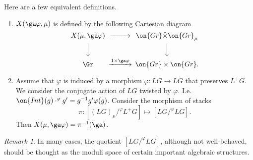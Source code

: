 \documentclass[]{pcmi}
\theoremstyle{plain}
\theoremstyle{remark}
\newtheorem{rmk}[equation]{Remark}
\theoremstyle{definition}
\newcommand{\Gr}{{\on{Gr}}}
\begin{document}
Here are a few equivalent definitions.
\begin{enumerate}
\item[(1)] $X(\ga\varphi,\mu)$ is defined by the following Cartesian diagram
\[\begin{CD}
X(\mu,\ga\varphi)@>>> \Gr\tilde\times\Gr_\mu\\
@VVV@VVV\\
\Gr@>1\times \ga\varphi>> \Gr\times \Gr.
\end{CD}\]

\item[(2)] Assume that $\varphi$ is induced by a morphism $\varphi:LG\to LG$ that preserves $L^+G$.
We consider the conjugate action of $LG$ twisted by $\varphi$. I.e. $\on{Int}(g)\cdot^\varphi g'= g^{-1}g' \varphi(g)$. Consider the morphism of stacks
\[\pi: [(LG)_\mu/^\varphi L^+G]\mapsto [LG/^\varphi LG].\]
Then $X(\mu,\ga\varphi)= \pi^{-1}(\ga)$.
\end{enumerate}

\begin{rmk}
In many cases, the quotient $[LG/^\varphi LG]$, although not well-behaved, should be thought as the moduli space of certain important algebraic structures.
\end{rmk}
\end{document}
